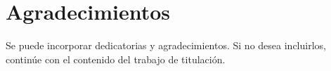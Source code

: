 \chapter*{Agradecimientos}
Se puede incorporar dedicatorias y agradecimientos. Si no desea incluirlos, continúe
con el contenido del trabajo de titulación.
